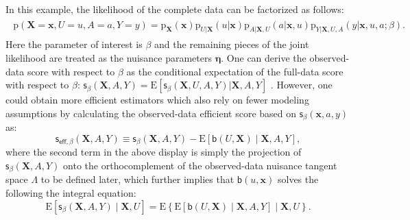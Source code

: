 \documentclass{article}
\def\eff{\mathsf{eff}}
\def\sfb{\mathsf{b}}
\def\sfb{\mathsf{b}}
\def\bfX{\mathbf{X}}
\def\bfx{\mathbf{x}}
\def\sfs{\mathsf{s}}
\theoremstyle{plain}
\theoremstyle{definition}
\theoremstyle{remark}
\def\E{\mathrm{E}}
\def\p{\mathrm{p}}
\begin{document}
In this example, the likelihood of the complete data can be factorized as follows:
\begin{align*}
\begin{split}
\p (\bfX = \bfx, U = u, A =  a, Y = y)  = \p_{\bfX} (\bfx) \p_{U | \bfX} (u | \bfx) \p_{A | \bfX, U} (a | \bfx, u) \p_{Y | \bfX, U, A} (y | \bfx, u, a; \beta).
\end{split}
\end{align*}
Here the parameter of interest is $\beta$ and the remaining pieces of the joint likelihood are treated as the nuisance parameters $\bm{\eta}$. 
One can derive the observed-data score with respect to $\beta$ as the conditional expectation of the full-data score with respect to $\beta$: $\sfs_{\beta} (\bfX, A, Y) = \E \left[\sfs_\beta(\bfX, U, A, Y) | \bfX, A, Y\right]$ \citep{robins1994estimation, van2003unified}. However, one could obtain more efficient estimators which also rely on fewer modeling assumptions by calculating the observed-data efficient score based on $\sfs_{\beta} (\bfx, a, y)$ as:
$$
\sfs_{\eff, \beta}(\bfX, A, Y) \equiv \sfs_\beta (\bfX, A, Y) - \E \left[ \sfb (U, \bfX) \mid \bfX, A, Y \right],
$$
where the second term in the above display is simply the projection of $\sfs_{\beta} (\bfX, A, Y)$ onto the orthocomplement of the observed-data nuisance tangent space $\Lambda$ to be defined later, which further implies that $\sfb (u,\bfx)$ solves the following the integral equation:
$$
\E\left[\sfs_\beta(\bfX, A, Y) \mid \bfX, U\right]=\E\left\{\E [\sfb (U, \bfX) \mid \bfX, A, Y] \mid \bfX, U\right\}.
$$
\end{document}
